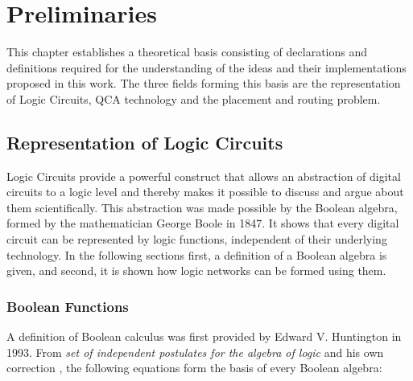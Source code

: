 \chapter{Preliminaries}\label{chapter:Preliminaries}
This chapter establishes a theoretical basis consisting of declarations and definitions required for the understanding of the ideas and their implementations proposed in this work. The three fields forming this basis are the representation of Logic Circuits, QCA technology and the placement and routing problem.

\section{Representation of Logic Circuits}
Logic Circuits provide a powerful construct that allows an abstraction of digital circuits to a logic level and thereby makes it possible to discuss and argue about them scientifically. This abstraction was made possible by the Boolean algebra, formed by the mathematician George Boole in 1847. It shows that every digital circuit can be represented by logic functions, independent of their underlying technology. In the following sections first, a definition of a Boolean algebra is given, and second, it is shown how logic networks can be formed using them.

\subsection{Boolean Functions}\label{subsec:boolfunc}
A definition of Boolean calculus was first provided by Edward V. Huntington in 1993. From \textit{set of independent postulates for the algebra of logic} and his own correction \cite{HuntingtonPostulate, HuntingtonCorrection}, the following equations form the basis of every Boolean algebra:

